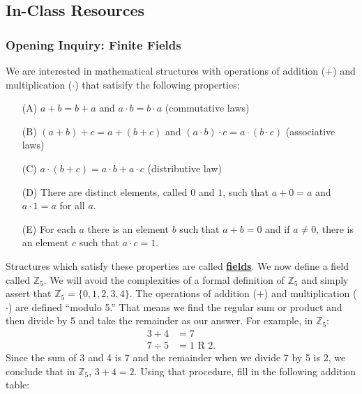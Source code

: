 \documentclass[11pt]{article}
\renewcommand\emph[1]{\underline{\bf{#1}}} %
\theoremstyle{definition}
\begin{document}
\newpage \subsection{In-Class Resources}

\subsubsection{Opening Inquiry: Finite Fields}

  We are interested in mathematical structures with operations of addition ($+$) and multiplication ($\cdot$) that satisify the following properties:
  \begin{itemize}
    \item[(A)] $a+b=b+a$ and $a\cdot b=b\cdot a$ (commutative laws)
    \item[(B)] $(a+b)+c = a + (b+c)$ and $(a\cdot b)\cdot c = a\cdot (b \cdot c)$ (associative laws)
    \item[(C)] $a\cdot (b+c) = a\cdot b + a \cdot c$ (distributive law)
    \item[(D)] There are distinct elements, called $0$ and $1$, such that $a+0 = a $ and $a \cdot 1 = a$ for all $a$.
    \item[(E)] For each $a$ there is an element $b$ such that $a + b = 0$ and if $a\neq 0$, there is an element $c$ such that $a\cdot c = 1$.
  \end{itemize}
  Structures which satisfy these properties are called \emph{fields}. We now define a field called $\mathbb{Z}_5$. We will avoid the complexities of a formal definition of $\mathbb{Z}_5$ and simply assert that 
  $\mathbb{Z}_5 = \{ 0, 1, 2, 3, 4\}$. The operations of addition ($+$) and multiplication ($\cdot$) are defined ``modulo 5.'' That means we find
  the regular sum or product and then divide by 5 and take the remainder as our answer. For example, in $\mathbb{Z}_5$:
  \begin{align*}
    3 + 4 &= 7\\
    7 \div 5 &= 1 \text{ R } 2.
  \end{align*}
  Since the sum of 3 and 4 is 7 and the remainder when we divide 7 by 5 is 2, we conclude that in $\mathbb{Z}_5$, $3 + 4 = 2$. Using that procedure, fill in
  the following addition table:
\end{document}
